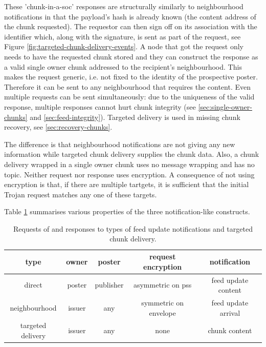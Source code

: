 These 'chunk-in-a-soc' responses are structurally similarly to neighbourhood notifications in that the payload's hash is already known (the content address of the chunk requested). The requestor can then sign off on its association with the identifier which, along with the signature, is sent as part of the request, see Figure \ref{fig:targeted-chunk-delivery-events}. A node that got the request only needs to have the requested chunk stored and they can construct the response as a valid single owner chunk addressed to the recipient's neighbourhood.
This makes the request generic, i.e. not fixed to the identity of the prospective poster. Therefore it can be sent to any neighbourhood that requires the content. Even multiple requests can be sent simultaneously: due to the uniqueness of the valid response, multiple responses cannot hurt chunk integrity (see \ref{sec:single-owner-chunks} and \ref{sec:feed-integrity}). Targeted delivery is used in missing chunk recovery, see \ref{sec:recovery-chunks}.

The difference is that neighbourhood notifications are not giving any new information while targeted chunk delivery supplies the chunk data. Also, a chunk delivery wrapped in a single owner chunk uses no message wrapping and has no topic. Neither request nor response uses encryption.
A consequence of not using encryption is that, if there are multiple tartgets, it is sufficient that the initial Trojan request matches any one of these targets. 

Table \ref{tab:notifications} summarises various properties of the three notification-like constructs.

\begin{table}[htpb]
    \centering
    \begin{tabular}{c|c|c|c|c|}
    type & owner & poster & request encryption & notification  \\\hline
         direct & poster & publisher & asymmetric on pss & feed update  content\\
         neighbourhood & issuer & any & symmetric on envelope & feed update arrival\\
         targeted delivery & issuer & any & none & chunk content\\
    \end{tabular}
    \caption[Feed update notifications]{Requests of and responses to types of feed update notifications and targeted chunk delivery.}
    \label{tab:notifications}
\end{table}

